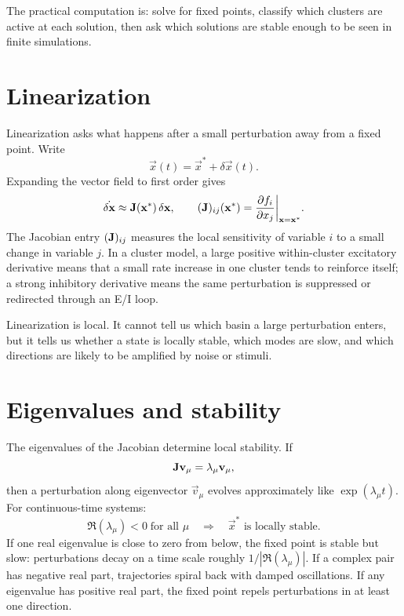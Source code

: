 The practical computation is: solve for fixed points, classify which clusters are active at each solution, then ask which solutions are stable enough to be seen in finite simulations.

\section{Linearization}
\label{sec:linearization-clustered}

Linearization asks what happens after a small perturbation away from a fixed point. Write
%
\begin{equation}
  \vec{x}(t)=\vec{x}^*+\delta\vec{x}(t).
  \label{eq:perturbation-definition}
\end{equation}
%
Expanding the vector field to first order gives
%
\begin{equation}
  \dot{\delta\mathbf{x}} \approx \mathbf{J}(\mathbf{x}^*)\,\delta\mathbf{x},
  \qquad
  (\mathbf{J})_{ij}(\mathbf{x}^*) =
  \frac{\partial f_i}{\partial x_j}\bigg|_{\mathbf{x}=\mathbf{x}^*}.
  \label{eq:jacobian-linearization}
\end{equation}
%
The Jacobian entry $(\mathbf{J})_{ij}$ measures the local sensitivity of variable $i$ to a small change in variable $j$. In a cluster model, a large positive within-cluster excitatory derivative means that a small rate increase in one cluster tends to reinforce itself; a strong inhibitory derivative means the same perturbation is suppressed or redirected through an E/I loop.

Linearization is local. It cannot tell us which basin a large perturbation enters, but it tells us whether a state is locally stable, which modes are slow, and which directions are likely to be amplified by noise or stimuli.

\section{Eigenvalues and stability}
\label{sec:eigenvalues-stability-clustered}

The eigenvalues of the Jacobian determine local stability. If
%
\begin{equation}
  \mathbf{J}\mathbf{v}_\mu = \lambda_\mu \mathbf{v}_\mu,
  \label{eq:jacobian-eigenmode}
\end{equation}
%
then a perturbation along eigenvector $\vec{v}_\mu$ evolves approximately like $\exp(\lambda_\mu t)$. For continuous-time systems:
%
\begin{equation}
  \Re(\lambda_\mu)<0 \;\text{for all }\mu
  \quad\Longrightarrow\quad
  \vec{x}^* \text{ is locally stable}.
  \label{eq:continuous-stability}
\end{equation}
%
If one real eigenvalue is close to zero from below, the fixed point is stable but slow: perturbations decay on a time scale roughly $1/|\Re(\lambda_\mu)|$. If a complex pair has negative real part, trajectories spiral back with damped oscillations. If any eigenvalue has positive real part, the fixed point repels perturbations in at least one direction.

